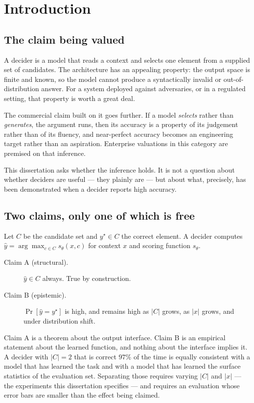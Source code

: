 \chapter{Introduction}

\section{The claim being valued}

A decider is a model that reads a context and selects one element from a supplied
set of candidates. The architecture has an appealing property: the output space is
finite and known, so the model cannot produce a syntactically invalid or
out-of-distribution answer. For a system deployed against adversaries, or in a
regulated setting, that property is worth a great deal.

The commercial claim built on it goes further. If a model \emph{selects} rather
than \emph{generates}, the argument runs, then its accuracy is a property of its
judgement rather than of its fluency, and near-perfect accuracy becomes an
engineering target rather than an aspiration. Enterprise valuations in this
category are premised on that inference.

This dissertation asks whether the inference holds. It is not a question about
whether deciders are useful --- they plainly are --- but about what, precisely,
has been demonstrated when a decider reports high accuracy.

\section{Two claims, only one of which is free}

Let $C$ be the candidate set and $y^\star \in C$ the correct element. A decider
computes $\hat y = \arg\max_{c \in C} s_\theta(x, c)$ for context $x$ and scoring
function $s_\theta$.

\begin{description}
  \item[Claim A (structural).] $\hat y \in C$ always. True by construction.
  \item[Claim B (epistemic).] $\Pr[\hat y = y^\star]$ is high, and remains high as
  $|C|$ grows, as $|x|$ grows, and under distribution shift.
\end{description}

Claim A is a theorem about the output interface. Claim B is an empirical statement
about the learned function, and nothing about the interface implies it. A decider
with $|C| = 2$ that is correct $97\%$ of the time is equally consistent with a
model that has learned the task and with a model that has learned the surface
statistics of the evaluation set. Separating those requires varying $|C|$ and
$|x|$ --- the experiments this dissertation specifies --- and requires an
evaluation whose error bars are smaller than the effect being claimed.


